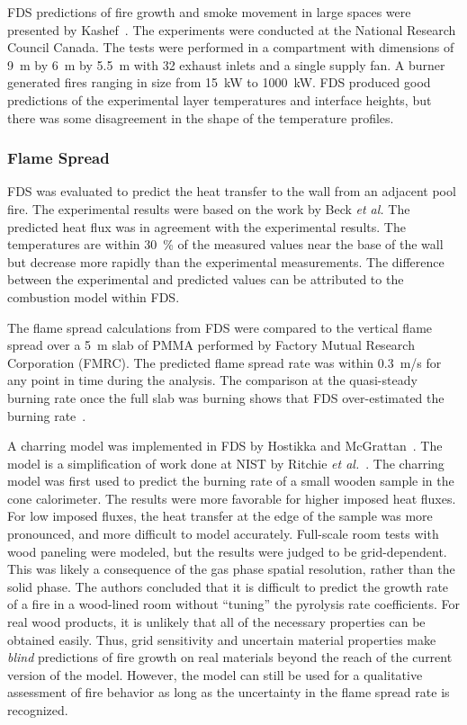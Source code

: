 FDS predictions of fire growth and smoke movement in large spaces were presented by  Kashef~\cite{Kashef:1}.  The experiments  were conducted at the
National Research Council  Canada.  The tests were performed in a compartment with  dimensions of 9~m by 6~m by  5.5~m with 32 exhaust inlets and a
single supply fan.  A burner  generated fires ranging in size  from 15~kW  to 1000~kW.   FDS produced  good predictions  of the experimental layer
temperatures and interface heights,  but there was some disagreement in the shape of the temperature profiles.


\subsubsection{Flame Spread}
\label{flame spread}

FDS was  evaluated to predict  the heat transfer  to the wall  from an adjacent pool fire.   The experimental results were based  on the work by Beck
{\em et al.}  The  predicted heat flux was  in agreement with the experimental  results.  The temperatures  are within 30~\%  of the measured values
near the base of  the wall but  decrease more rapidly than  the  experimental  measurements.   The  difference  between  the experimental and
predicted values  can be attributed to the combustion model within FDS.

The flame spread  calculations from FDS were compared  to the vertical flame  spread over  a 5~m  slab of  PMMA performed  by  Factory Mutual
Research  Corporation (FMRC).   The  predicted flame  spread rate  was within  0.3~m/s  for any  point  in  time  during the  analysis.   The
comparison at  the quasi-steady  burning rate once  the full  slab was burning     shows    that     FDS    over-estimated     the    burning
rate~\cite{Ma:2,Ma:3}.

A   charring  model   was   implemented  in   FDS   by  Hostikka   and McGrattan~\cite{Hostikka:2}.  The model  is a  simplification  of work done at
NIST by Ritchie  {\em et al.}~\cite{Ritchie:1}.  The charring model was  first used to  predict the burning  rate of a  small wooden sample in the
cone calorimeter.  The results were  more favorable for higher imposed heat fluxes. For  low imposed fluxes, the heat transfer at the edge  of the
sample was more pronounced,  and more difficult to model  accurately.   Full-scale room  tests  with  wood paneling  were modeled, but  the results
were  judged to be grid-dependent.  This was likely a consequence of the  gas phase spatial resolution, rather than the solid phase. The authors
concluded that it is difficult to predict the growth rate of a fire  in a wood-lined room without ``tuning'' the pyrolysis rate  coefficients. For
real  wood products, it  is unlikely that all  of the  necessary properties can  be obtained  easily. Thus, grid sensitivity  and uncertain  material
properties make  {\em blind} predictions of fire  growth on real materials beyond  the reach of the current version of the model. However, the model
can still be used for a qualitative assessment  of fire behavior as long  as the uncertainty in the flame spread rate is recognized.


